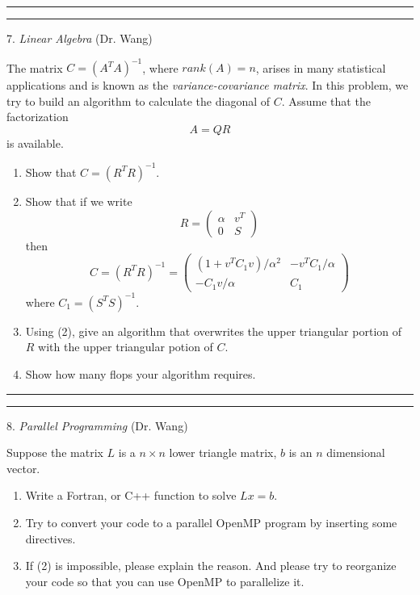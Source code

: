 \documentclass [11point]{article}
\begin{document}
\bigskip
\hrule 


\pagebreak
\hrule 
\medskip

7. \textit{Linear Algebra} (Dr. Wang)
\bigskip

The matrix $C = (A^TA)^{-1}$, where $rank(A) = n$, arises in many
statistical applications and is known as the
\emph{variance-covariance matrix}. In this problem, we try to build
an algorithm to calculate the diagonal of $C$. Assume that the
factorization
$$A = QR$$ is available.

\begin{enumerate}
\item Show that $C = (R^TR)^{-1}$.

\item Show that if we write
$$
R = \left(
\begin{array}{rr}
\alpha & v^T \\
0 & S
\end{array} \right)
$$
then
$$
C = (R^TR)^{-1} = \left(
\begin{array}{rr}
(1+v^TC_1v)/\alpha^2 & -v^TC_1/\alpha \\
-C_1v/\alpha & C_1
\end{array} \right)
$$
where $C_1 = (S^TS)^{-1}$.

\item Using (2), give an algorithm that overwrites the upper triangular
portion of $R$ with the upper triangular potion of $C$.

\item Show how many flops your algorithm requires.

\end{enumerate}

\bigskip
\hrule 

\pagebreak
\hrule 
\medskip

8. \textit{Parallel Programming} (Dr. Wang)
\bigskip

Suppose the matrix $L$ is a $n\times n$ lower triangle matrix, $b$
is an $n$ dimensional vector.

\begin{enumerate}
\item Write a Fortran, or C++ function to solve $Lx = b$.

\item Try to convert your code to a parallel OpenMP program by inserting some directives.

\item If (2) is impossible, please explain the reason. And please try to reorganize your code so that you can use OpenMP to parallelize it.
\end{enumerate}
\end{document}
